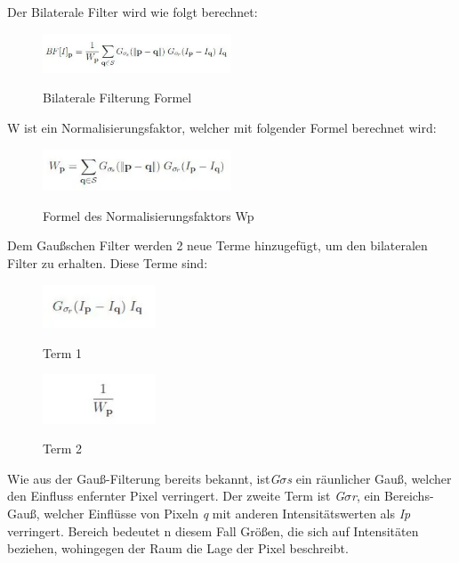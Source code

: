     Der Bilaterale Filter wird wie folgt berechnet:
    \begin{figure}[H]
        \centering
        \includegraphics[width=0.5\textwidth]{pics/Bilateral-Filtering-in-Python-OpenCV.jpeg}
        \caption{Bilaterale Filterung Formel}
        \cite{BilateralFormula1}
        \label{fig:anpr:bilat:1}
        \end{figure}
W ist ein Normalisierungsfaktor, welcher mit folgender Formel berechnet wird:
\begin{figure}[H]
    \centering
    \includegraphics[width=0.5\textwidth]{pics/Bilateral-Filtering-in-Python-OpenCV-Formula2.jpeg}
    \caption{Formel des Normalisierungsfaktors Wp}
    \cite{BilateralFormula2}
    \label{fig:anpr:bilat:2}
    \end{figure}
Dem Gaußschen Filter werden 2 neue Terme hinzugefügt, um den bilateralen Filter zu erhalten. Diese Terme sind:
 \begin{figure}[H]
    \centering
    \includegraphics[width=0.3\textwidth]{pics/Bilateral-Filtering-in-Python-OpenCV-Formula3.jpeg}
    \caption{Term 1}
    \cite{BilateralFormula3}
    \label{fig:anpr:bilat:3}
    \end{figure}
\begin{figure}[H]
        \centering
        \includegraphics[width=0.3\textwidth]{pics/Bilateral-Filtering-in-Python-OpenCV-Formula4.jpeg}
        \caption{Term 2}
        \cite{BilateralFormula4}
        \label{fig:anpr:bilat:4}
        \end{figure}
Wie aus der Gauß-Filterung bereits bekannt, ist\textit{G\(\sigma\)s} ein räunlicher Gauß, welcher den Einfluss enfernter Pixel verringert. Der zweite Term ist \textit{G\(\sigma\)r}, ein Bereichs-Gauß, welcher Einflüsse von Pixeln \textit{q} mit anderen Intensitätswerten als \textit{Ip} verringert. Bereich bedeutet n diesem Fall Größen, die sich auf Intensitäten beziehen, wohingegen der Raum die Lage der Pixel beschreibt.\\
